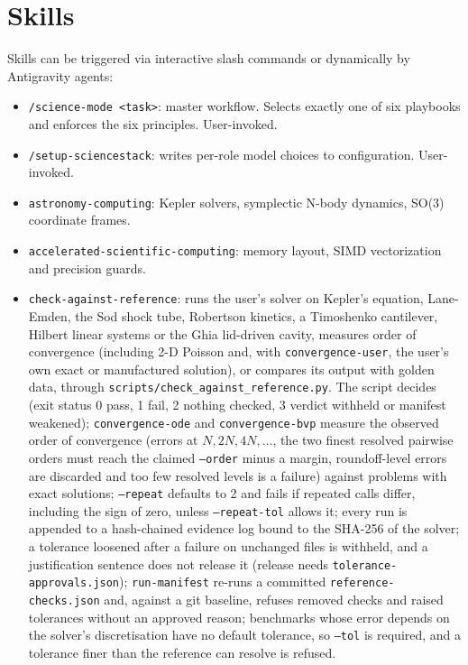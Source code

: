 \documentclass[11pt,a4paper]{report}
\begin{document}
\section{Skills}
Skills can be triggered via interactive slash commands or dynamically by Antigravity agents:
\begin{itemize}[itemsep=2pt]
    \item \texttt{/science-mode <task>}: master workflow. Selects exactly one of six playbooks and enforces the six principles. User-invoked.
    \item \texttt{/setup-sciencestack}: writes per-role model choices to configuration. User-invoked.
    \item \texttt{astronomy-computing}: Kepler solvers, symplectic N-body dynamics, SO(3) coordinate frames.
    \item \texttt{accelerated-scientific-computing}: memory layout, SIMD vectorization and precision guards.
    \item \texttt{check-against-reference}: runs the user's solver on Kepler's equation, Lane-Emden, the Sod shock tube, Robertson kinetics, a Timoshenko cantilever, Hilbert linear systems or the Ghia lid-driven cavity, measures order of convergence (including 2-D Poisson and, with \texttt{convergence-user}, the user's own exact or manufactured solution), or compares its output with golden data, through \texttt{scripts/check\_against\_reference.py}. The script decides (exit status 0 pass, 1 fail, 2 nothing checked, 3 verdict withheld or manifest weakened); \texttt{convergence-ode} and \texttt{convergence-bvp} measure the observed order of convergence (errors at $N, 2N, 4N, \dots$, the two finest resolved pairwise orders must reach the claimed \texttt{--order} minus a margin, roundoff-level errors are discarded and too few resolved levels is a failure) against problems with exact solutions; \texttt{--repeat} defaults to 2 and fails if repeated calls differ, including the sign of zero, unless \texttt{--repeat-tol} allows it; every run is appended to a hash-chained evidence log bound to the SHA-256 of the solver; a tolerance loosened after a failure on unchanged files is withheld, and a justification sentence does not release it (release needs \texttt{tolerance-approvals.json}); \texttt{run-manifest} re-runs a committed \texttt{reference-checks.json} and, against a git baseline, refuses removed checks and raised tolerances without an approved reason; benchmarks whose error depends on the solver's discretisation have no default tolerance, so \texttt{--tol} is required, and a tolerance finer than the reference can resolve is refused.

\end{itemize}
\end{document}
